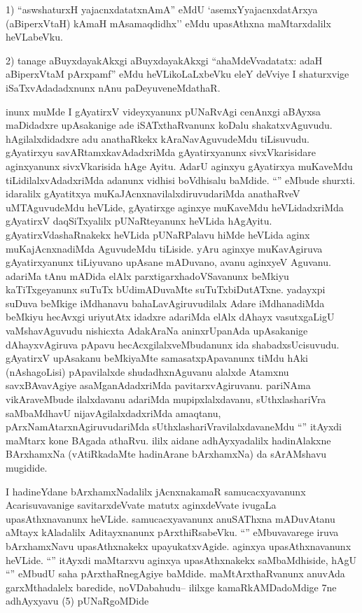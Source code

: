 \begin{artha}
1) ``aswshaturxH yajacnxdatatxnAmA'' eMdU `asemxYyajacnxdatArxya (aBiperxVtaH) kAmaH mAsamaqdidhx'' eMdu upasAthxna maMtarxdalilx heVLabeVku.

2) tanage aBuyxdayakAkxgi aBuyxdayakAkxgi ``ahaMdeVvadatatx: adaH aBiperxVtaM pArxpamf'' eMdu heVLikoLaLxbeVku eleY deVviye I shaturxvige iSaTxvAdadadxnunx nAnu paDeyuveneMdathaR.
\end{artha}

\begin{artha}
inunx muMde I gAyatirxV videyxyanunx pUNaRvAgi cenAnxgi aBAyxsa maDidadxre upAsakanige ade iSATxthaRvanunx koDalu shakatxvAguvudu. hAgilalxdidadxre adu anathaRkekx kAraNavAguvudeMdu tiLisuvudu. gAyatirxyu savARtamxkavAdadxriMda gAyatirxyanunx sivxVkarisidare aginxyanunx sivxVkarisida hAge Ayitu. AdarU aginxyu gAyatirxya muKaveMdu tiLidilalxvAdadxriMda adanunx vidhisi boVdhisalu baMdide. ``\stext'' eMbude shurxti. idaralilx gAyatitxya muKaJAcnxnavilalxdiruvudariMda anathaRveV uMTAguvudeMdu heVLide, gAyatirxge aginxye muKaveMdu heVLidadxriMda gAyatirxV daqSiTxyalilx pUNaRteyanunx heVLida hAgAyitu. gAyatirxVdashaRnakekx heVLida pUNaRPalavu hiMde heVLida aginx muKajAcnxnadiMda AguvudeMdu tiLiside. yAru aginxye muKavAgiruva gAyatirxyanunx tiLiyuvano upAsane mADuvano, avanu aginxyeV Aguvanu. adariMa tAnu mADida elAlx parxtigarxhadoVSavanunx beMkiyu kaTiTxgeyanunx suTuTx bUdimADuvaMte suTuTxbiDutATxne. yadayxpi suDuva beMkige iMdhanavu  bahaLavAgiruvudilalx Adare iMdhanadiMda beMkiyu hecAvxgi uriyutAtx idadxre adariMda elAlx dAhayx vasutxgaLigU vaMshavAguvudu nishicxta AdakAraNa aninxrUpanAda upAsakanige dAhayxvAgiruva pApavu hecAcxgilalxveMbudanunx ida shabadxsUcisuvudu. gAyatirxV upAsakanu beMkiyaMte samasatxpApavanunx tiMdu hAki (nAshagoLisi) pApavilalxde shudadhxnAguvanu alalxde Atamxnu savxBAvavAgiye asaMganAdadxriMda pavitarxvAgiruvanu. pariNAma vikAraveMbude ilalxdavanu adariMda mupipxlalxdavanu, sUthxlashariVra saMbaMdhavU nijavAgilalxdadxriMda amaqtanu, pArxNamAtarxnAgiruvudariMda sUthxlashariVravilalxdavaneMdu ``\stext'' itAyxdi maMtarx kone BAgada athaRvu. ililx aidane adhAyxyadalilx hadinAlakxne BArxhamxNa (vAtiRkadaMte hadinArane bArxhamxNa) da sArAMshavu mugidide.
\end{artha}

\begin{artha}
I hadineYdane bArxhamxNadalilx jAcnxnakamaR samucacxyavanunx Acarisuvavanige savitarxdeVvate matutx aginxdeVvate ivugaLa upasAthxnavanunx heVLide. samucacxyavanunx anuSAThxna mADuvAtanu aMtayx kAladalilx Aditayxnanunx pArxthiRsabeVku. ``\stext'' eMbuvavarege iruva bArxhamxNavu upasAthxnakekx upayukatxvAgide. aginxya upasAthxnavanunx heVLide. ``\stext'' itAyxdi maMtarxvu aginxya upasAthxnakekx saMbaMdhiside, hAgU ``\stext'' eMbudU saha pArxthaRnegAgiye baMdide. maMtArxthaRvanunx anuvAda garxMthadalelx baredide, noVDabahudu-- ililxge kamaRkAMDadoMdige 7ne adhAyxyavu (5) pUNaRgoMDide 
\end{artha}


